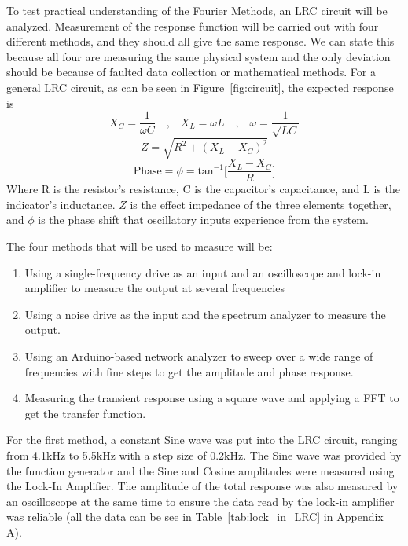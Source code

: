 \documentclass[12pt]{article}
\begin{document}
To test practical understanding of the Fourier Methods, an LRC circuit will be analyzed. Measurement of the response function will be carried out with four different methods, and they should all give the same response. We can state this because all four are measuring the same physical system and the only deviation should be because of faulted data collection or mathematical methods. For a general LRC circuit, as can be seen in Figure~\ref{fig:circuit}, the expected response is
\begin{equation*}
    X_C = \frac{1}{\omega C}\quad \text{,} \quad X_L = \omega L \quad \text{,} \quad \omega = \frac{1}{\sqrt{LC}}
\end{equation*}
\begin{equation}
    Z = \sqrt{R^2 + (X_L - X_C)^2}
\end{equation}
\begin{equation}
    \text{Phase} = \phi = \text{tan}^{-1}\Big[\frac{X_L-X_C}{R}\Big]
\end{equation}
Where R is the resistor's resistance, C is the capacitor's capacitance, and L is the indicator's inductance. $Z$ is the effect impedance of the three elements together, and $\phi$ is the phase shift that oscillatory inputs experience from the system. 

The four methods that will be used to measure will be: 
\begin{enumerate}
    \item Using a single-frequency drive as an input and an oscilloscope and lock-in amplifier to measure the output at several frequencies
    \item Using a noise drive as the input and the spectrum analyzer to measure the output.
    \item Using an Arduino-based network analyzer to sweep over a wide range of frequencies with fine steps to get the amplitude and phase response.
    \item Measuring the transient response using a square wave and applying a FFT to get the transfer function.
\end{enumerate}

For the first method, a constant Sine wave was put into the LRC circuit, ranging from 4.1kHz to 5.5kHz with a step size of 0.2kHz. The Sine wave was provided by the function generator and the Sine and Cosine amplitudes were measured using the Lock-In Amplifier. The amplitude of the total response was also measured by an oscilloscope at the same time to ensure the data read by the lock-in amplifier was reliable (all the data can be see in Table~\ref{tab:lock_in_LRC} in Appendix A). 
\end{document}
